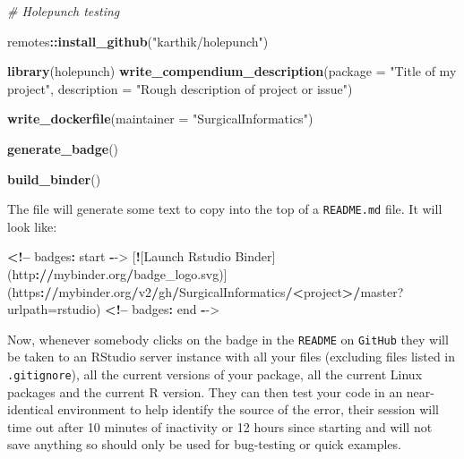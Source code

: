 \documentclass[]{book}
\newenvironment{Shaded}{\begin{snugshade}}{\end{snugshade}}
\newcommand{\CommentTok}[1]{\textcolor[rgb]{0.56,0.35,0.01}{\textit{#1}}}
\newcommand{\DataTypeTok}[1]{\textcolor[rgb]{0.13,0.29,0.53}{#1}}
\newcommand{\ErrorTok}[1]{\textcolor[rgb]{0.64,0.00,0.00}{\textbf{#1}}}
\newcommand{\KeywordTok}[1]{\textcolor[rgb]{0.13,0.29,0.53}{\textbf{#1}}}
\newcommand{\NormalTok}[1]{#1}
\newcommand{\OperatorTok}[1]{\textcolor[rgb]{0.81,0.36,0.00}{\textbf{#1}}}
\newcommand{\StringTok}[1]{\textcolor[rgb]{0.31,0.60,0.02}{#1}}
\theoremstyle{definition}
\theoremstyle{definition}
\theoremstyle{definition}
\theoremstyle{remark}
\begin{document}
\begin{Shaded}
\begin{Highlighting}[]
\CommentTok{# Holepunch testing}

\NormalTok{remotes}\OperatorTok{::}\KeywordTok{install_github}\NormalTok{(}\StringTok{"karthik/holepunch"}\NormalTok{)}

\KeywordTok{library}\NormalTok{(holepunch)}
\KeywordTok{write_compendium_description}\NormalTok{(}\DataTypeTok{package =} \StringTok{"Title of my project"}\NormalTok{, }
                             \DataTypeTok{description =} \StringTok{"Rough description of project or issue"}\NormalTok{)}

\KeywordTok{write_dockerfile}\NormalTok{(}\DataTypeTok{maintainer =} \StringTok{"SurgicalInformatics"}\NormalTok{)}

\KeywordTok{generate_badge}\NormalTok{()}

\KeywordTok{build_binder}\NormalTok{()}
\end{Highlighting}
\end{Shaded}

The file will generate some text to copy into the top of a
\texttt{README.md} file. It will look like:

\begin{Shaded}
\begin{Highlighting}[]
\OperatorTok{<!--}\StringTok{ }\NormalTok{badges}\OperatorTok{:}\StringTok{ }\NormalTok{start }\OperatorTok{-}\NormalTok{->}
\NormalTok{[}\OperatorTok{!}\NormalTok{[Launch Rstudio Binder](http}\OperatorTok{:}\ErrorTok{//}\NormalTok{mybinder.org}\OperatorTok{/}\NormalTok{badge_logo.svg)](https}\OperatorTok{:}\ErrorTok{//}\NormalTok{mybinder.org}\OperatorTok{/}\NormalTok{v2}\OperatorTok{/}\NormalTok{gh}\OperatorTok{/}\NormalTok{SurgicalInformatics}\OperatorTok{/}\ErrorTok{<}\NormalTok{project}\OperatorTok{>}\ErrorTok{/}\NormalTok{master?}\DataTypeTok{urlpath=}\NormalTok{rstudio)}
\OperatorTok{<!--}\StringTok{ }\NormalTok{badges}\OperatorTok{:}\StringTok{ }\NormalTok{end }\OperatorTok{-}\NormalTok{->}
\end{Highlighting}
\end{Shaded}

Now, whenever somebody clicks on the badge in the \texttt{README} on
\texttt{GitHub} they will be taken to an RStudio server instance with
all your files (excluding files listed in \texttt{.gitignore}), all the
current versions of your package, all the current Linux packages and the
current R version. They can then test your code in an near-identical
environment to help identify the source of the error, their session will
time out after 10 minutes of inactivity or 12 hours since starting and
will not save anything so should only be used for bug-testing or quick
examples.
\end{document}
